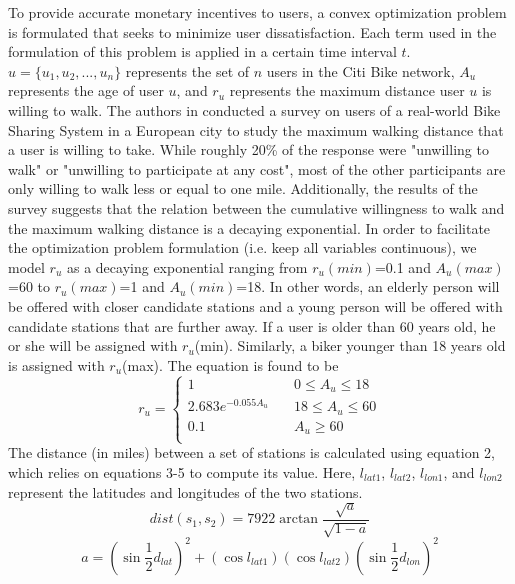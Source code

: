 \documentclass[times, 10pt,twocolumn]{article}
\begin{document}
To provide accurate monetary incentives to users, a convex optimization problem is formulated that seeks to minimize user dissatisfaction. Each term used in the formulation of this problem is applied in a certain time interval $t$. $u = \{u_1, u_2, ..., u_n\}$ represents the set of $n$ users in the Citi Bike network, $A_u$ represents the age of user $u$, and $r_u$ represents the maximum distance user $u$ is willing to walk. The authors in \cite{incentives} conducted a survey on users of a real-world Bike Sharing System in a European city to study the maximum walking distance that a user is willing to take. While roughly 20\% of the response were "unwilling to walk" or "unwilling to participate at any cost", most of the other participants are only willing to walk less or equal to one mile. Additionally, the results of the survey suggests that the relation between the cumulative willingness to walk and the maximum walking distance is a decaying exponential. In order to facilitate the optimization problem formulation (i.e. keep all variables continuous), we model $r_u$ as a decaying exponential ranging from $r_u(min)$=0.1 and $A_u(max)$=60 to $r_u(max)$=1 and $A_u(min)$=18. In other words, an elderly person will be offered with closer candidate stations and a young person will be offered with candidate stations that are further away. If a user is older than 60 years old, he or she will be assigned with $r_u$(min). Similarly, a biker younger than 18 years old is assigned with $r_u$(max). The equation is found to be
\begin{equation}
r_u = \left\{
        \begin{array}{lll}
            1 & \quad 0 \leq A_u \leq 18 \\
            2.683e^{-0.055A_u} & \quad 18 \leq A_u \leq 60 \\
            0.1 & \quad A_u \geq 60 \\
        \end{array}
    \right.
\end{equation}
The distance (in miles) between a set of stations is calculated using equation 2, which relies on equations 3-5 to compute its value. Here, $l_{lat1}$, $l_{lat2}$, $l_{lon1}$, and $l_{lon2}$ represent the latitudes and longitudes of the two stations.
\begin{equation}
dist(s_1,s_2) = 7922\arctan{\frac{\sqrt{a}}{\sqrt{1-a}}}
\end{equation}
\begin{equation}
a = (\sin{\frac{1}{2}d_{lat}})^2+(\cos{l_{lat1}})(\cos{l_{lat2}})(\sin{\frac{1}{2}d_{lon}})^2
\end{equation}
\end{document}
